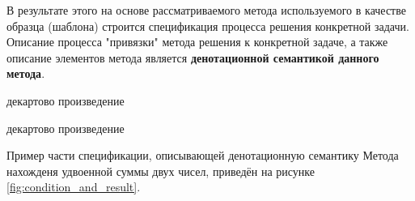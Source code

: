 В результате этого на основе рассматриваемого метода используемого в качестве образца (шаблона) строится спецификация процесса решения конкретной задачи. Описание процесса "привязки" метода решения к конкретной задаче, а также описание элементов метода является \textbf{денотационной семантикой данного метода}.

\begin{SCn}
\begin{scnindent}
\end{scnindent}
\begin{scnindent}
    \begin{scnreltovector}{декартово произведение}
    \end{scnreltovector}
\end{scnindent}
\begin{scnindent}
    \begin{scnreltovector}{декартово произведение}
    \end{scnreltovector}
\end{scnindent}
\end{SCn}

Пример части спецификации, описывающей денотационную семантику Метода нахожденя удвоенной суммы двух чисел, приведён на рисунке \ref{fig:condition_and_result}.

